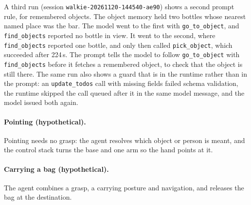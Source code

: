 \documentclass[12pt,a4paper]{article}
\begin{document}
A third run (session \texttt{walkie-20261120-144540-ae90}) shows a second prompt rule, for
remembered objects. The object memory held two bottles whose nearest named place was the bar. The
model went to the first with \texttt{go\_to\_object}, and \texttt{find\_objects} reported no bottle
in view. It went to the second, where \texttt{find\_objects} reported one bottle, and only then
called \texttt{pick\_object}, which succeeded after 224\,s. The prompt tells the model to follow
\texttt{go\_to\_object} with \texttt{find\_objects} before it fetches a remembered object, to check
that the object is still there. The same run also shows a guard that is in the runtime rather than
in the prompt: an \texttt{update\_todos} call with missing fields failed schema validation, the
runtime skipped the call queued after it in the same model message, and the model issued both again.

\paragraph{Pointing (hypothetical).}
Pointing needs no grasp: the agent resolves which object or person is meant, and the control stack
turns the base and one arm so the hand points at it.

\paragraph{Carrying a bag (hypothetical).}
The agent combines a grasp, a carrying posture and navigation, and releases the bag at the
destination.
\end{document}
